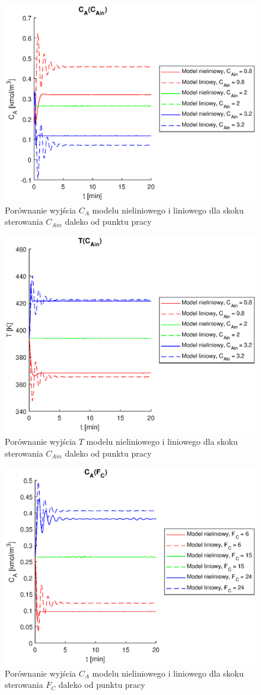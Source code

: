 \begin{figure}
	\centering
	\includegraphics[width=.8\linewidth]{plot/lin_cacain_1.eps}
	\caption{Porównanie wyjścia $C_A$ modelu nieliniowego i liniowego dla skoku sterowania $C_{Ain}$ daleko od punktu pracy}
	\label{fig:lincacain1}
\end{figure}
\begin{figure}
	\centering
	\includegraphics[width=.8\linewidth]{plot/lin_tcain_1.eps}
	\caption{Porównanie wyjścia $T$ modelu nieliniowego i liniowego dla skoku sterowania $C_{Ain}$ daleko od punktu pracy}
	\label{fig:lintcain1}
\end{figure}
\begin{figure}
	\centering
	\includegraphics[width=.8\linewidth]{plot/lin_cafc_1.eps}
	\caption{Porównanie wyjścia $C_A$ modelu nieliniowego i liniowego dla skoku sterowania $F_C$ daleko od punktu pracy}
	\label{fig:lincafc1}
\end{figure}
